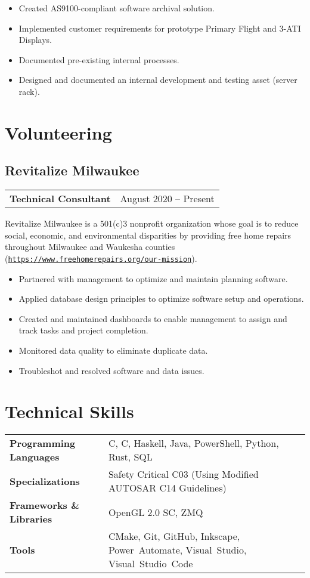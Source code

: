 \documentclass[10pt]{article}
\newcommand{\Rplus}{\protect\raisebox{0.35ex}{\smaller{\smaller{\textbf{+}}}}}
\newcommand{\Rsharp}{\protect\raisebox{0.35ex}{\smaller{\smaller{\textbf{\#}}}}}
\newcommand{\Cpp}{\mbox{C\Rplus\Rplus}}
\newcommand{\Csharp}{\mbox{C\Rsharp}}
\newcommand{\firstpar}{\vspace{4pt}\noindent}
\begin{document}
\begin{itemize}[noitemsep, leftmargin=*]
  \item Created AS9100-compliant software archival solution.
  \item Implemented customer requirements for prototype Primary Flight and 3-ATI Displays.
  \item Documented pre-existing internal processes.
  \item Designed and documented an internal development and testing asset (server rack).
\end{itemize}

\section*{Volunteering}
\subsection*{Revitalize Milwaukee}
\begin{tabular}{@{}ll@{}}
  \textbf{Technical Consultant} & August 2020 -- Present
\end{tabular}

\firstpar
Revitalize Milwaukee is a 501(c)3 nonprofit organization whose goal is to reduce social, economic,
and environmental disparities by providing free home repairs throughout Milwaukee and Waukesha counties
(\href{https://www.freehomerepairs.org/our-mission}{\texttt{https://www.freehomerepairs.org/our-mission}}).

\begin{itemize}[noitemsep, leftmargin=*]
  \item Partnered with management to optimize and maintain planning software.
  \item Applied database design principles to optimize software setup and operations.
  \item Created and maintained dashboards to enable management to assign and track tasks and project completion.
  \item Monitored data quality to eliminate duplicate data.
  \item Troubleshot and resolved software and data issues.
\end{itemize}

\section*{Technical Skills}
\begin{tabularx}{\textwidth}{@{}>{\bfseries}l>{\raggedright\arraybackslash}X@{}}
  Programming Languages &
  \Cpp, \Csharp, Haskell, Java, PowerShell, Python, Rust, SQL \\
  Specializations &
  Safety Critical \Cpp{03} (Using Modified AUTOSAR \Cpp{14} Guidelines) \\
  Frameworks \& Libraries &
  OpenGL 2.0 SC, ZMQ \\
  Tools &
  CMake, Git, GitHub, Inkscape, \mbox{Power Automate}, \mbox{Visual Studio}, \mbox{Visual Studio Code}
\end{tabularx}
\end{document}
